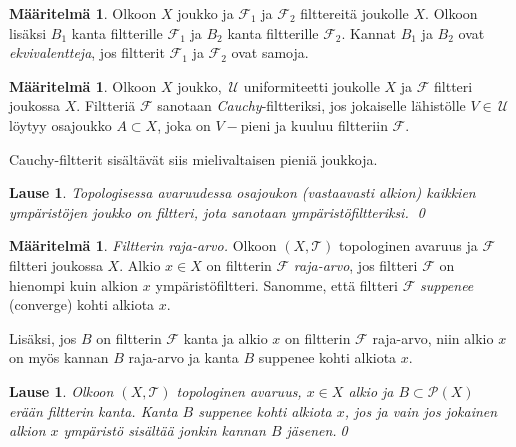 \documentclass[12pt,a4paper,leqno]{report}
\newcommand{\U}{\,\mathcal{U}}
\newcommand{\T}{\mathcal{T}}
\newcommand{\Pot}{\mathcal{P}}
\newcommand{\F}{\mathcal{F}}
\theoremstyle{plain}
\newtheorem{lause}[equation]{Lause}
\theoremstyle{definition}
\newtheorem{maar}[equation]{Määritelmä}
\theoremstyle{remark}
\begin{document}
\begin{maar}
Olkoon $X$ joukko ja $\F_1$ ja $\F_2$ filttereitä joukolle $X$. 
Olkoon lisäksi $B_1$ kanta filtterille $\F_1$ ja $B_2$ kanta filtterille $\F_2$. 
Kannat $B_1$ ja $B_2$ ovat \emph{ekvivalentteja}, 
jos filtterit $\F_1$ ja $\F_2$ ovat samoja.
\end{maar}
\begin{maar}\label{Cauchy-filtteri}
Olkoon $X$ joukko, $\U$ uniformiteetti joukolle $X$ ja $\F$ filtteri joukossa $X$. 
Filtteriä $\F$ sanotaan \emph{Cauchy}-filtteriksi, 
jos jokaiselle lähistölle $V\in\U$ löytyy osajoukko $A\subset X$, 
joka on $V-$pieni ja kuuluu filtteriin $\F$. %
\end{maar}
\noindent Cauchy-filtterit sisältävät siis mielivaltaisen pieniä joukkoja. 
\begin{lause}
Topologisessa avaruudessa osajoukon (vastaavasti alkion) kaikkien ympäristöjen joukko on filtteri, jota sanotaan ympäristöfiltteriksi.
\qed
\end{lause}
\begin{maar}
\emph{Filtterin raja-arvo.} 
Olkoon $(X,\T)$ topologinen avaruus ja $\F$ filtteri joukossa $X$. 
Alkio $x\in X$ on filtterin $\F$ \emph{raja-arvo}, 
jos filtteri $\F$ on hienompi kuin 
alkion $x$ ympäristöfiltteri. %
Sanomme, että filtteri $\F$ \emph{suppenee} (converge) kohti alkiota $x$. 

Lisäksi, jos $B$ on filtterin $\F$ kanta 
ja alkio $x$ on filtterin $\F$ raja-arvo, 
niin alkio $x$ on myös kannan $B$ raja-arvo ja 
kanta $B$ suppenee kohti alkiota $x$.
\end{maar}
\begin{lause}
Olkoon $(X,\T)$ topologinen avaruus, $x\in X$ alkio ja $B\subset\Pot(X)$ erään filtterin kanta. Kanta $B$ suppenee kohti alkiota $x$, jos ja vain jos 
jokainen alkion $x$ ympäristö sisältää jonkin kannan $B$ jäsenen.\qed
\end{lause}
\end{document}
